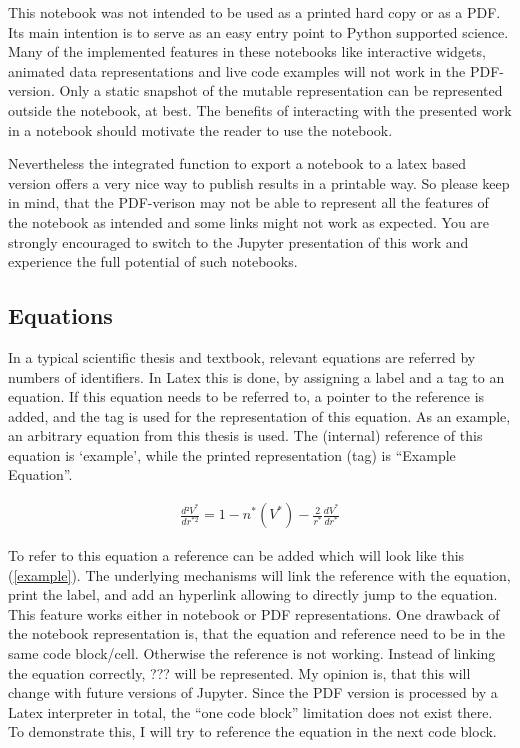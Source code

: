 \documentclass[11pt]{article}
\begin{document}
This notebook was not intended to be used as a printed hard copy or as a
PDF. Its main intention is to serve as an easy entry point to Python
supported science. Many of the implemented features in these notebooks
like interactive widgets, animated data representations and live code
examples will not work in the PDF-version. Only a static snapshot of the
mutable representation can be represented outside the notebook, at best.
The benefits of interacting with the presented work in a notebook should
motivate the reader to use the notebook.

Nevertheless the integrated function to export a notebook to a latex
based version offers a very nice way to publish results in a printable
way. So please keep in mind, that the PDF-verison may not be able to
represent all the features of the notebook as intended and some links
might not work as expected. You are strongly encouraged to switch to the
Jupyter presentation of this work and experience the full potential of
such notebooks.

\hypertarget{equations}{%
\subsection{Equations}\label{equations}}

In a typical scientific thesis and textbook, relevant equations are
referred by numbers of identifiers. In Latex this is done, by assigning
a label and a tag to an equation. If this equation needs to be referred
to, a pointer to the reference is added, and the tag is used for the
representation of this equation. As an example, an arbitrary equation
from this thesis is used. The (internal) reference of this equation is
`example', while the printed representation (tag) is ``Example
Equation''.

\begin{align}
\frac{d²V^{*}}{dr^{*2}}=1-n^{*}(V^{*})-\frac{2}{r^{*}}\frac{dV^{*}}{dr^{*}}\label{example}\tag{Example Equation}
\end{align}

To refer to this equation a reference can be added which will look like
this (\ref{example}). The underlying mechanisms will link the reference
with the equation, print the label, and add an hyperlink allowing to
directly jump to the equation. This feature works either in notebook or
PDF representations. One drawback of the notebook representation is,
that the equation and reference need to be in the same code block/cell.
Otherwise the reference is not working. Instead of linking the equation
correctly, ??? will be represented. My opinion is, that this will change
with future versions of Jupyter. Since the PDF version is processed by a
Latex interpreter in total, the ``one code block'' limitation does not
exist there. To demonstrate this, I will try to reference the equation
in the next code block.
\end{document}
